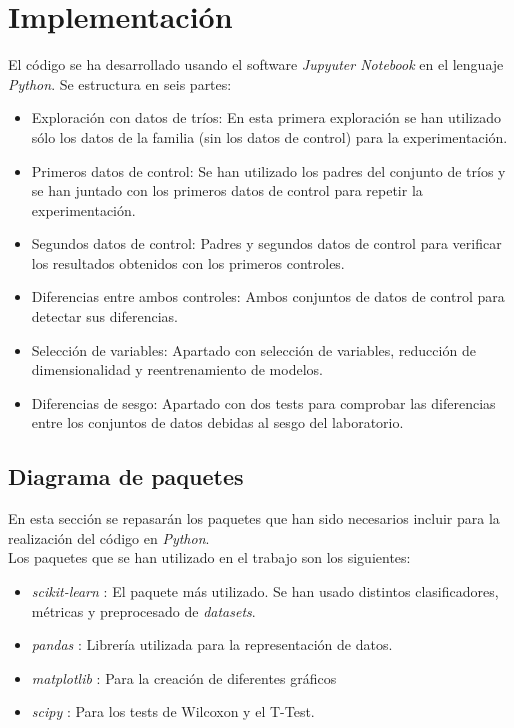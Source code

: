 
\chapter{Implementación}
El código se ha desarrollado usando el software \textit{Jupyuter Notebook} en el lenguaje \textit{Python}. Se estructura en seis partes:
\begin{itemize}
  \item Exploración con datos de tríos: En esta primera exploración se han utilizado sólo los datos de la familia (sin los datos de control) para la experimentación.
  \item Primeros datos de control: Se han utilizado los padres del conjunto de tríos y se han juntado con los primeros datos de control para repetir la experimentación.
  \item Segundos datos de control: Padres y segundos datos de control para verificar los resultados obtenidos con los primeros controles.
  \item Diferencias entre ambos controles: Ambos conjuntos de datos de control para detectar sus diferencias.
  \item Selección de variables: Apartado con selección de variables, reducción de dimensionalidad y reentrenamiento de modelos.
  \item Diferencias de sesgo: Apartado con dos tests para comprobar las diferencias entre los conjuntos de datos debidas al sesgo del laboratorio.
\end{itemize}
\section{Diagrama de paquetes}
En esta sección se repasarán los paquetes que han sido necesarios incluir para la realización del código en \textit{Python}.\\
Los paquetes que se han utilizado en el trabajo son los siguientes:
\begin{itemize}
\itemsep 0em 
  \item \textit{scikit-learn} \cite{scikit-learn}: El paquete más utilizado. Se han usado distintos clasificadores, métricas y preprocesado de \textit{datasets}.
  \item \textit{pandas} \cite{mckinney-proc-scipy-2010}: Librería utilizada para la representación de datos.
  \item \textit{matplotlib} \cite{Hunter:2007}: Para la creación de diferentes gráficos
  \item \textit{scipy} \cite{scipy}: Para los tests de Wilcoxon y el T-Test.
\end{itemize}

